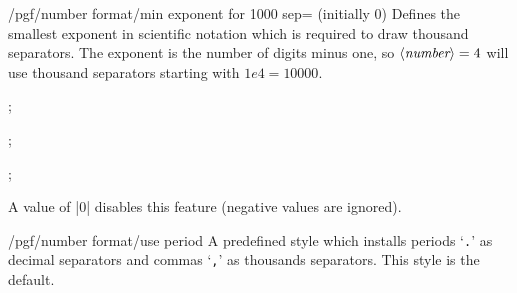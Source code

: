 \begin{key}{/pgf/number format/min exponent for 1000 sep= (initially 0)}
    Defines the smallest exponent in scientific notation which is required to
    draw thousand separators. The exponent is the number of digits minus one,
    so $\langle\textit{number}\rangle=4$ will use thousand separators starting with $1e4 =
    10000$.
\begin{codeexample}[pre={\begin{lateximage}},post={\end{lateximage}}]
; 
\end{codeexample}

\begin{codeexample}[pre={\begin{lateximage}},post={\end{lateximage}}]
; 
\end{codeexample}

\begin{codeexample}[pre={\begin{lateximage}},post={\end{lateximage}}]
; 
\end{codeexample}
    \noindent A value of |0| disables this feature (negative values are
    ignored).
\end{key}


\begin{key}{/pgf/number format/use period}
    A predefined style which installs periods `\texttt{.}' as decimal
    separators and commas `\texttt{,}' as thousands separators. This style is
    the default.
\begin{codeexample}[pre={\begin{lateximage}},post={\end{lateximage}}]
\end{codeexample}

\begin{codeexample}[pre={\begin{lateximage}},post={\end{lateximage}}]
\end{codeexample}
\end{key}

